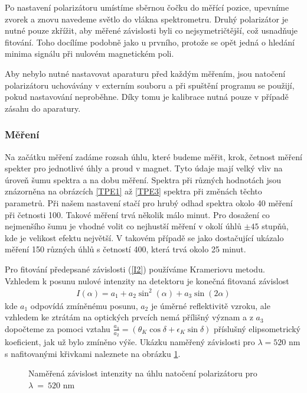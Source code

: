 Po nastavení polarizátoru umístíme sběrnou čočku do měřící pozice, upevníme zvorek a znovu navedeme světlo do vlákna spektrometru.
Druhý polarizátor je nutné pouze zkřížit, aby měřené závislosti byli co nejsymetričtější, což usnadňuje fitování. Toho docílíme podobně jako u prvního, protože se opět jedná o hledání minima signálu při nulovém magnetickém poli.

Aby nebylo nutné nastavovat aparaturu před každým měřením, jsou natočení polarizátoru uchovávány v externím souboru a při spuštění programu se použijí, pokud nastavování neproběhne. Díky tomu je kalibrace nutná pouze v případě zásahu do aparatury. 


\subsubsection{Měření}
Na začátku měření zadáme rozsah úhlu, které budeme měřit, krok, četnost měření spekter pro jednotlivé úhly a proud v magnet. 
Tyto údaje mají velký vliv na úroveň šumu spektra a na dobu měření. Spektra při různých hodnotách jsou znázorněna na obrázcích 
\ref{TPE1} až \ref{TPE3} spektra při změnách těchto parametrů. Při našem nastavení stačí pro hrubý odhad spektra okolo 40 měření při četnosti 100. 
Takové měření trvá několik málo minut. 
Pro dosažení co nejmenšího šumu je vhodné volit co nejhustší měření v okolí úhlů $\pm 45$ stupňů, kde je velikost efektu největší. 
V takovém případě se jako dostačující ukázalo měření 150 různých úhlů s četností 400, která trvá okolo 25 minut.

Pro fitování předepsané závislosti (\ref{I2}) používáme Krameriovu metodu. Vzhledem k posunu nulové intenzity na detektoru je konečná fitovaná závislost
\begin{eqnarray}
I(\alpha)=a_1+a_2\sin^2(\alpha)+a_3\sin(2\alpha)
\end{eqnarray}
kde $a_1$ odpovídá zmíněnému posunu, $a_2$ je úměrné reflektivitě vzroku, ale vzhledem ke ztrátám na optických prvcích nemá přílišný význam a z $a_3$ dopočteme za pomoci vztahu $\frac{a_3}{a_2}=(\theta_K\cos\delta+\epsilon_K\sin\delta)$ příslušný elipsometrický koeficient, jak už bylo zmíněno výše. Ukázku naměřený závislosti pro $\lambda=520$ nm s nafitovanými křivkami naleznete na obrázku \ref{TPE0}.

\begin{figure}

\caption{Naměřená závislost intenzity na úhlu natočení polarizátoru pro $\lambda~=~520$ nm}
\label{TPE0}
\end{figure}

